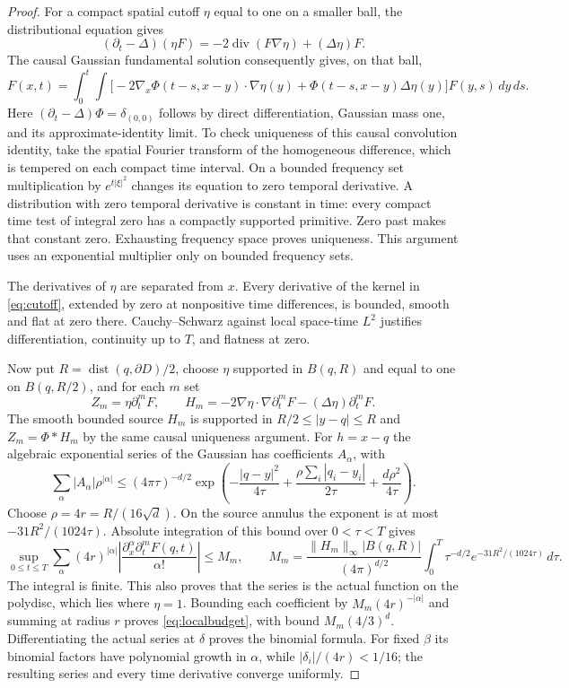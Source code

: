 \documentclass[11pt]{article}
\theoremstyle{remark}
\newcommand{\dt}{\partial_t}
\DeclareMathOperator{\dist}{dist}
\begin{document}
\begin{proof}
For a compact spatial cutoff $\eta$ equal to one on a smaller ball,
the distributional equation gives
\[
 (\dt-\Delta)(\eta F)
       =-2\operatorname{div}(F\nabla\eta)+(\Delta\eta)F.
\]
The causal Gaussian fundamental solution consequently gives, on that ball,
\begin{equation}\label{eq:cutoff}
 F(x,t)=\int_0^t\int
 \big[-2\nabla_x\Phi(t-s,x-y)\cdot\nabla\eta(y)
              +\Phi(t-s,x-y)\Delta\eta(y)\big]F(y,s)\,dy\,ds.
\end{equation}
Here $(\dt-\Delta)\Phi=\delta_{(0,0)}$ follows by direct differentiation,
Gaussian mass one, and its approximate-identity limit.
To check uniqueness of this causal convolution identity, take the spatial
Fourier transform of the homogeneous difference, which is tempered on
each compact time interval. On a bounded frequency set multiplication
by $e^{t|\xi|^2}$ changes its equation to zero temporal derivative.
A distribution with zero temporal derivative is constant in time:
every compact time test of integral zero has a compactly supported
primitive. Zero past makes that constant zero.
Exhausting frequency space proves uniqueness. This argument uses an
exponential multiplier only on bounded frequency sets.

The derivatives of $\eta$ are separated from $x$.
Every derivative of the kernel in \eqref{eq:cutoff}, extended by zero at
nonpositive time differences, is bounded, smooth and flat at zero there.
Cauchy--Schwarz against local space-time $L^2$ justifies differentiation,
continuity up to $T$, and flatness at zero.

Now put $R=\dist(q,\partial D)/2$, choose $\eta$ supported in $B(q,R)$
and equal to one on $B(q,R/2)$, and for each $m$ set
\[
 Z_m=\eta\partial_t^mF,\qquad
 H_m=-2\nabla\eta\cdot\nabla\partial_t^mF
                   -(\Delta\eta)\partial_t^mF.
\]
The smooth bounded source $H_m$ is supported in
$R/2\leq|y-q|\leq R$ and
$Z_m=\Phi*H_m$ by the same causal uniqueness argument.
For $h=x-q$ the algebraic exponential series of the Gaussian has coefficients
$A_\alpha$, with
\[
 \sum_\alpha|A_\alpha|\rho^{|\alpha|}
 \leq(4\pi\tau)^{-d/2}
 \exp\left(-\frac{|q-y|^2}{4\tau}
       +\frac{\rho\sum_i|q_i-y_i|}{2\tau}
       +\frac{d\rho^2}{4\tau}\right).
\]
Choose $\rho=4r=R/(16\sqrt d)$.
On the source annulus the exponent is at most
$-31R^2/(1024\tau)$.
Absolute integration of this bound over $0<\tau<T$ gives
\[
 \sup_{0\leq t\leq T}
 \sum_\alpha(4r)^{|\alpha|}
  \left|\frac{\partial_x^\alpha\partial_t^mF(q,t)}{\alpha!}\right|
 \leq M_m,\qquad
 M_m=\frac{\|H_m\|_\infty|B(q,R)|}{(4\pi)^{d/2}}
     \int_0^T\tau^{-d/2}e^{-31R^2/(1024\tau)}\,d\tau .
\]
The integral is finite. This also proves that the series is the actual
function on the polydisc, which lies where $\eta=1$.
Bounding each coefficient by $M_m(4r)^{-|\alpha|}$ and summing at radius
$r$ proves \eqref{eq:localbudget}, with bound $M_m(4/3)^d$.
Differentiating the actual series at $\delta$ proves the binomial formula.
For fixed $\beta$ its binomial factors have polynomial growth in $\alpha$,
while $|\delta_i|/(4r)<1/16$; the resulting series and every time
derivative converge uniformly.
\end{proof}
\end{document}
